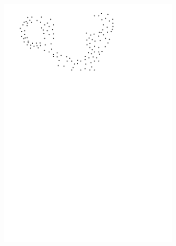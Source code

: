 \begin{figure}[h]
\begin{subfigure}[b]{0.22\linewidth}
    \includegraphics[page=3,width=\textwidth]{figs/idea.pdf}
  \end{subfigure}%
  \quad
  \begin{subfigure}[b]{0.22\linewidth}
    \centering

\end{subfigure}
\end{figure}
